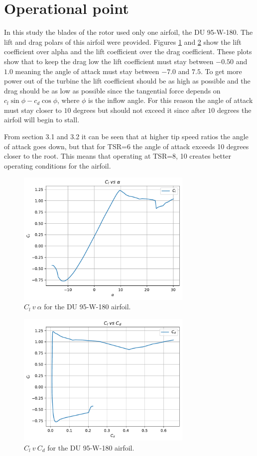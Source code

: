 \section{Operational point}
In this study the blades of the rotor used only one airfoil, the DU 95-W-180. The lift and drag polars of this airfoil were provided. Figures \ref{img:clva} and \ref{img:clvcd} show the lift coefficient over alpha and the lift coefficient over the drag coefficient. These plots show that to keep the drag low the lift coefficient must stay between $-0.50$ and $1.0$ meaning the angle of attack must stay between $-7.0$ and $7.5$. To get more power out of the turbine the lift coefficient should be as high as possible and the drag should be as low as possible since the tangential force depends on $c_l \sin \phi - c_d \cos \phi$, where $\phi$ is the inflow angle. For this reason the angle of attack must stay closer to $10$ degrees but should not exceed it since after $10$ degrees the airfoil will begin to stall. 

From section 3.1 and 3.2 it can be seen that at higher tip speed ratios the angle of attack goes down, but that for TSR=6 the angle of attack exceeds 10 degrees closer to the root. This means that operating at TSR=8, 10 creates better operating conditions for the airfoil. 
\begin{figure}[htbp]
\includegraphics[width=0.75\textwidth]{./img/yaw/Cl_v_alpha.pdf}
\caption{$C_l\ v\ \alpha$ for the DU 95-W-180 airfoil.}
\centering
\label{img:clva}
\end{figure}
\begin{figure}[htbp]
\includegraphics[width=0.75\textwidth]{./img/yaw/Cd_v_Cl.pdf}
\caption{$C_l\ v\ C_d$ for the DU 95-W-180 airfoil.}
\centering
\label{img:clvcd}
\end{figure}
